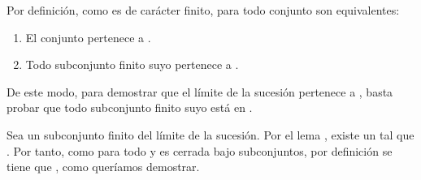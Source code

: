 \begin{isabellebody}
\begin{isamarkuptext}
  \begin{demostracion}
    Por definición, como  es de carácter finito, para todo conjunto son equivalentes:
    \begin{enumerate}
      \item El conjunto pertenece a .
      \item Todo subconjunto finito suyo pertenece a .
    \end{enumerate}

    De este modo, para demostrar que el límite de la sucesión  pertenece a , basta probar
    que todo subconjunto finito suyo está en .

    Sea  un subconjunto finito del límite de la sucesión. Por el lema , existe un
     tal que . Por tanto, como  para todo  y  es cerrada bajo
    subconjuntos, por definición se tiene que , como queríamos demostrar.
  \end{demostracion}


\end{isamarkuptext}
\end{isabellebody}

